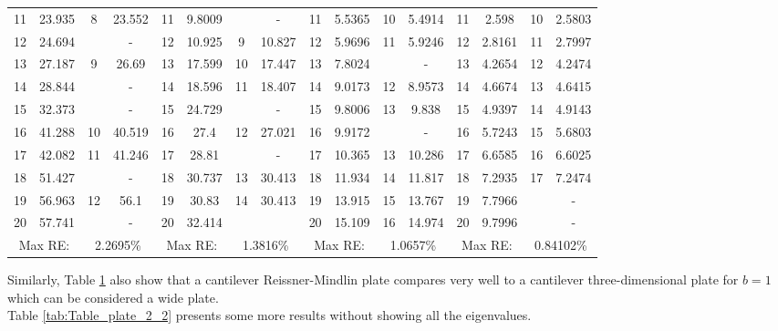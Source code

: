 \documentclass[../../main.tex]{subfiles}
\begin{document}
\begin{table}[htbp]
{{\begin{tabular}{|cccc||cccc||cccc||cccc|}
			11    & 23.935 & 8     & {23.552} & 11    & 9.8009 &       & {-} & 11    & 5.5365 & 10    & 5.4914 & 11    & 2.598 & 10    & {2.5803} \\
			12    & 24.694 &       & -     & 12    & 10.925 & 9     & 10.827 & 12    & 5.9696 & 11    & 5.9246 & 12    & 2.8161 & 11    & {2.7997} \\
			13    & 27.187 & 9     & {26.69} & 13    & 17.599 & 10    & 17.447 & 13    & 7.8024 &       & {-} & 13    & 4.2654 & 12    & {4.2474} \\
			14    & 28.844 &       & -     & 14    & 18.596 & 11    & 18.407 & 14    & 9.0173 & 12    & 8.9573 & 14    & 4.6674 & 13    & {4.6415} \\
			15    & 32.373 &       & -     & 15    & 24.729 &       & {-} & 15    & 9.8006 & 13    & 9.838 & 15    & 4.9397 & 14    & {4.9143} \\
			16    & 41.288 & 10    & {40.519} & 16    & 27.4  & 12    & 27.021 & 16    & 9.9172 &       & {-} & 16    & 5.7243 & 15    & {5.6803} \\
			17    & 42.082 & 11    & {41.246} & 17    & 28.81 &       & {-} & 17    & 10.365 & 13    & 10.286 & 17    & 6.6585 & 16    & {6.6025} \\
			18    & 51.427 &       & -     & 18    & 30.737 & 13    & 30.413 & 18    & 11.934 & 14    & 11.817 & 18    & 7.2935 & 17    & {7.2474} \\
			19    & 56.963 & 12    & {56.1} & 19    & 30.83 & 14    & 30.413 & 19    & 13.915 & 15    & 13.767 & 19    & 7.7966 &       & - \\
			20    & 57.741 &       & -     & 20    & 32.414 &       &       & 20    & 15.109 & 16    & 14.974 & 20    & 9.7996 &       & - \\
			\hline
			\multicolumn{2}{|c}{Max RE:} & \multicolumn{2}{c||}{2.2695\%} & \multicolumn{2}{c}{Max RE:} & \multicolumn{2}{c||}{1.3816\%} & \multicolumn{2}{c}{Max RE:} & \multicolumn{2}{c||}{1.0657\%} & \multicolumn{2}{c}{Max RE:} & \multicolumn{2}{c|}{0.84102\%} \\
			\hline
		\end{tabular}%
		\label{tab:Table_plate_2}%
	}}
\end{table}%
\FloatBarrier

Similarly, Table \ref{tab:Table_plate_2} also show that a cantilever Reissner-Mindlin plate compares very well to a cantilever three-dimensional plate for $b=1$ which can be considered a wide plate.\\

Table \ref{tab:Table_plate_2_2} presents some more results without showing all the eigenvalues.
\end{document}
